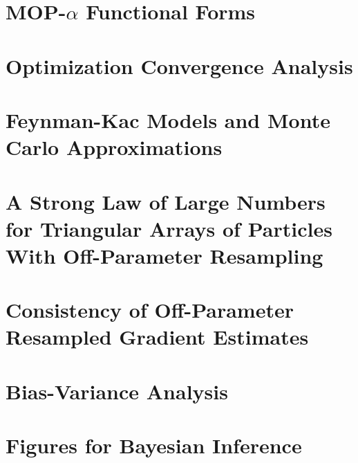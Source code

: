 \documentclass[11pt]{article}
\newcommand\arxiv[2]{#1} %
\begin{document}
% 


\arxiv{
\appendix

\section{MOP-$\alpha$ Functional Forms}
\label{appendix:functional}



\section{Optimization Convergence Analysis}
\label{appendix:convergence}


\section{Feynman-Kac Models and Monte Carlo Approximations}
\label{appendix:feynman}


\section{A Strong Law of Large Numbers for Triangular Arrays of Particles With Off-Parameter Resampling}
\label{appendix:targeting}



\section{Consistency of Off-Parameter Resampled Gradient Estimates}
\label{appendix:consistency}


\section{Bias-Variance Analysis}
\label{appendix:biasvar}

}{
}

\section{Figures for Bayesian Inference}
\label{appendix:bayes}

\end{document}
